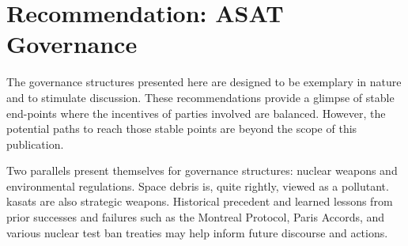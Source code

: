 \section{Recommendation: ASAT Governance}
\label{section::governance}

The governance structures presented here are designed to be exemplary
in nature and to stimulate discussion.  These recommendations provide
a glimpse of stable end-points where the incentives of parties
involved are balanced.  However, the potential paths to reach those
stable points are beyond the scope of this publication.

Two parallels present themselves for governance structures: nuclear
weapons and environmental regulations.  Space debris is, quite
rightly, viewed as a pollutant.  \acp{kasat} are also strategic
weapons.  Historical precedent and learned lessons from prior
successes and failures such as the Montreal Protocol, Paris Accords,
and various nuclear test ban treaties may help inform future discourse
and actions.


